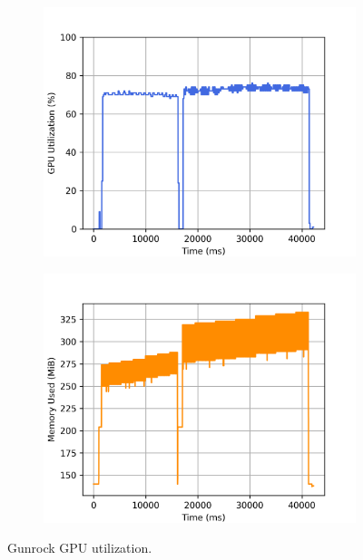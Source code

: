 \begin{figure}
    \begin{subfigure}{0.5\textwidth}
        \centering
        \includegraphics[width=\linewidth]{Chapters/Figures/plots/Gunrock_update_spmv_log_gpu_utilization.png}
    \end{subfigure}%
    \begin{subfigure}{0.5\textwidth}
        \centering
        \includegraphics[width=\linewidth]{Chapters/Figures/plots/Gunrock_update_spmv_log_gpu_memory.png}
    \end{subfigure}%
    \caption{Gunrock GPU utilization.}
    \label{fig:Gunrock_gpu_log}
\end{figure}

